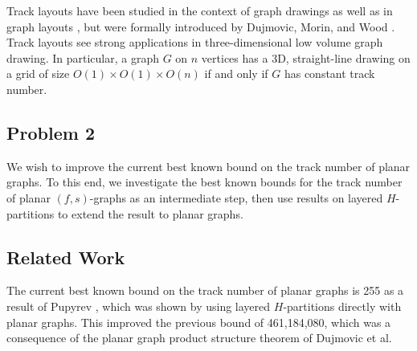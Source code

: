 \documentclass[../main.tex]{subfiles}
\begin{document}
	Track layouts have been studied in the context of graph drawings \cite{GLM05, FLW-JGAA03} as well as in graph layouts \cite{HR92}, but were formally introduced by Dujmovic, Morin, and Wood \cite{DMW05}. Track layouts see strong applications in three-dimensional low volume graph drawing. In particular, a graph $G$ on $n$ vertices has a 3D, straight-line drawing on a grid of size $O(1)\times O(1)\times O(n)$ if and only if $G$ has constant track number.
	
	\subsection{Problem 2}
	We wish to improve the current best known bound on the track number of planar graphs. To this end, we investigate the best known bounds for the track number of planar $(f,s)$-graphs as an intermediate step, then use results on layered $H$-partitions to extend the result to planar graphs.
	
	\subsection{Related Work}
	The current best known bound on the track number of planar graphs is 255 as a result of Pupyrev \cite{Pupyrev20}, which was shown by using layered $H$-partitions directly with planar graphs. This improved the previous bound of 461,184,080, which was a consequence of the planar graph product structure theorem of Dujmovic et al. \cite{DJMMUW19}
	
	
	
	
\end{document}
